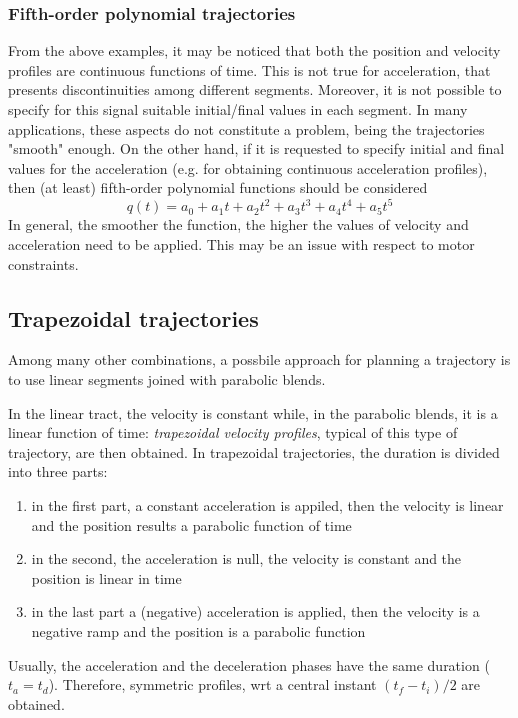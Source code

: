 \documentclass{book}
\begin{document}
\subsubsection{Fifth-order polynomial trajectories}
From the above examples, it may be noticed that both the position and velocity profiles are continuous functions of time. This is not true for acceleration, that presents discontinuities among different segments. Moreover, it is not possible to specify for this signal suitable initial/final values in each segment. In many applications, these aspects do not constitute a problem, being the trajectories "smooth" enough.  On the other hand, if it is requested to specify initial and final values for the
acceleration (e.g. for obtaining continuous acceleration profiles), then (at least)
fifth-order polynomial functions should be considered
\[
    q(t)=a_0+a_1t+a_2t^2+a_3t^3+a_4t^4+a_5t^5
\]
In general, the smoother the function, the higher the values of velocity and acceleration need to be applied. This may be an issue with respect to motor constraints. 

\subsection{Trapezoidal trajectories}

Among many other combinations, a possbile approach for planning a trajectory is to use linear segments joined with parabolic blends. 

In the linear tract, the velocity is constant while, in the parabolic blends, it is a linear function of time:  \emph{trapezoidal velocity profiles}, typical of this type of trajectory, are then obtained. In trapezoidal trajectories, the duration is divided into three parts: 
\begin{enumerate}
  \item in the first part, a constant acceleration is appiled, then the velocity is linear and the position results a parabolic function of time 
  \item in the second, the acceleration is null, the velocity is constant and the position is linear in time 
  \item in the last part a (negative) acceleration is applied, then the velocity is a negative ramp and the position is a parabolic function
\end{enumerate}
Usually, the acceleration and the deceleration phases have the same duration ($t_a=t_d$). Therefore, symmetric profiles, wrt a central instant $(t_f-t_i)/2$ are obtained. 
\end{document}
